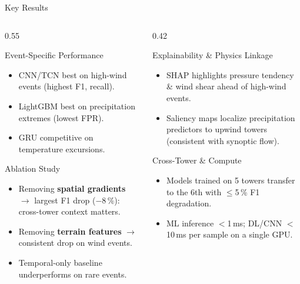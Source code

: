 \documentclass[aspectratio=169,10pt]{beamer}
\begin{document}
\begin{frame}{Key Results}
\begin{columns}[T]
  \begin{column}{0.55\textwidth}
    \begin{block}{Event-Specific Performance}
      \begin{itemize}
        \item CNN/TCN best on high-wind events (highest F1, recall).
        \item LightGBM best on precipitation extremes (lowest FPR).
        \item GRU competitive on temperature excursions.
      \end{itemize}
    \end{block}
    \begin{block}{Ablation Study}
      \begin{itemize}
        \item Removing \textbf{spatial gradients} $\rightarrow$
              largest F1 drop ($-$8\,\%): cross-tower context matters.
        \item Removing \textbf{terrain features} $\rightarrow$
              consistent drop on wind events.
        \item Temporal-only baseline underperforms on rare events.
      \end{itemize}
    \end{block}
  \end{column}

  \begin{column}{0.42\textwidth}
    \begin{block}{Explainability \& Physics Linkage}
      \begin{itemize}
        \item SHAP highlights pressure tendency \& wind shear
              ahead of high-wind events.
        \item Saliency maps localize precipitation predictors
              to upwind towers (consistent with synoptic flow).
      \end{itemize}
    \end{block}
    \begin{block}{Cross-Tower \& Compute}
      \begin{itemize}
        \item Models trained on 5 towers transfer to the 6th
              with $\le$5\,\% F1 degradation.
        \item ML inference $<$1\,ms; DL/CNN $<$10\,ms per sample
              on a single GPU.
      \end{itemize}
    \end{block}
  \end{column}
\end{columns}
\end{frame}
\end{document}
